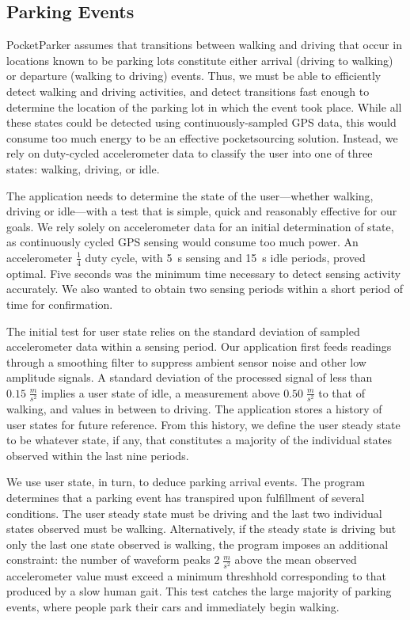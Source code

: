 \subsection{Parking Events}
\label{subsec-goals}

PocketParker assumes that transitions between walking and driving that occur
in locations known to be parking lots constitute either arrival (driving to
walking) or departure (walking to driving) events. Thus, we must be able to
efficiently detect walking and driving activities, and detect transitions
fast enough to determine the location of the parking lot in which the event
took place. While all these states could be detected using
continuously-sampled GPS data, this would consume too much energy to be an
effective pocketsourcing solution. Instead, we rely on duty-cycled
accelerometer data to classify the user into one of three states: walking,
driving, or idle.

The application needs to determine the state of the user---whether walking,
driving or idle---with a test that is simple, quick and reasonably effective
for our goals.  We rely solely on accelerometer data for an initial
determination of state, as continuously cycled GPS sensing would consume too
much power. An accelerometer $\frac{1}{4}$ duty cycle, with 5~s sensing and
15~s idle periods, proved optimal. Five seconds was the minimum time
necessary to detect sensing activity accurately. We also wanted to obtain two
sensing periods within a short period of time for confirmation.

The initial test for user state relies on the standard deviation of sampled
accelerometer data within a sensing period. Our application first feeds
readings through a smoothing filter to suppress ambient sensor noise and
other low amplitude signals. A standard deviation of the processed signal of
less than $0.15\;\frac{m}{s^2}$ implies a user state of idle, a measurement
above $0.50\;\frac{m}{s^2}$ to that of walking, and values in between to
driving. The application stores a history of user states for future
reference. From this history, we define the user steady state to be whatever
state, if any, that constitutes a majority of the individual states observed
within the last nine periods.

We use user state, in turn, to deduce parking arrival events. The program
determines that a parking event has transpired upon fulfillment of several
conditions. The user steady state must be driving and the last two
individual states observed must be walking. Alternatively, if the steady
state is driving but only the last one state observed is walking, the program
imposes an additional constraint: the number of waveform peaks
$2\;\frac{m}{s^2}$ above the mean observed accelerometer value must exceed
a minimum threshhold corresponding to that produced by a slow human gait.
This test catches the large majority of parking events, where people park
their cars and immediately begin walking.

